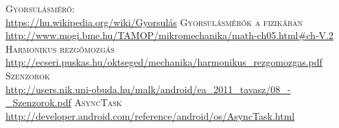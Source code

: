 \documentclass{thesis-ekf}
\theoremstyle{definition}
\theoremstyle{remark}
\begin{document}
\begin{thebibliography}{1}
 \textsc{Gyorsulásmérő}:\\\url{https://hu.wikipedia.org/wiki/Gyorsulás}
 \textsc{Gyorsulásmérők a fizikában}\\ \url{http://www.mogi.bme.hu/TAMOP/mikromechanika/math-ch05.html#ch-V.2}
 \textsc{Harmonikus rezgőmozgás}\\
\url{http://ecseri.puskas.hu/oktseged/mechanika/harmonikus_rezgomozgas.pdf}
 \textsc{Szenzorok}\\
\url{http://users.nik.uni-obuda.hu/malk/android/ea_2011_tavasz/08_-_Szenzorok.pdf}
 \textsc{AsyncTask}\\
\url{http://developer.android.com/reference/android/os/AsyncTask.html}
\end{thebibliography}
\end{document}
